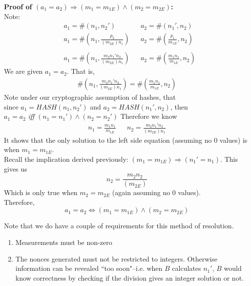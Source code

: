 \documentclass[10pt,a4paper,tikz]{article}
\begin{document}
\textbf{Proof of $ (a_1 = a_2) \Longrightarrow (m_1 = m_{1E}) \land (m_2 = m_{2E})$:}\\
Note:\\
\begin{align*}
&a_1 = \#(n_1, n_2') &&a_2 = \#(n_1', n_2) \\
&a_1 = \#(n_1, \frac{p_2}{(m_{2E})n_1}) &&a_2 = \#(\frac{p_1}{m_{1E}}, n_2) \\
\\
&a_1 = \#(n_1, \frac{m_2n_1'n_2}{(m_{2E})n_1}) &&a_2 = \#(\frac{m_1n_1}{m_{1E}},  n_2)
\end{align*}
We are given $a_1 = a_2 $. That is,
\begin{align*}
\#(n_1, \frac{m_2n_1'n_2}{(m_{2E})n_1}) = \#(\frac{m_1n_1}{m_{1E}}, n_2)
\end{align*}
Note under our cryptographic assumption of hashes, that\\ 
since $a_1 = HASH(n_1,n_2')$ and $a_2 = HASH(n_1',n_2)$, then \\ 
$a_1 = a_2$ \textit{iff} $(n_1 = n_1') \land (n_2 = n_2')$
Therefore we know
\begin{align*}
n_1 = \frac{m_1n_1}{m_{1E}} && n_2 = \frac{m_2n_1'n_2}{(m_{2E})n_1}
\end{align*}
It shows that the only solution to the left side equation (assuming no 0 values) is when $m_1 = m_{1E}$.\\
Recall the implication derived previously: $(m_1 = m_{1E}) \Longrightarrow (n_1' = n_1)$. This gives us 
\begin{equation*}
n_2 = \frac{m_2n_2}{(m_{2E})}
\end{equation*}
Which is only true when $m_2 = m_{2E}$ (again assuming no 0 values).\\
Therefore,
\begin{equation}
a_1 = a_2 \Longleftrightarrow (m_1 = m_{1E}) \land (m_2 = m_{2E})
\end{equation}

Note that we do have a couple of requirements for this method of resolution.
\begin{enumerate}
\item Measurements must be non-zero
\item The nonces generated must not be restricted to integers. Otherwise information can be revealed ``too soon"--i.e. when $B$ calculates $n_1'$, $B$ would know correctness by checking if the division gives an integer solution or not. 
\end{enumerate} 
\end{document}
